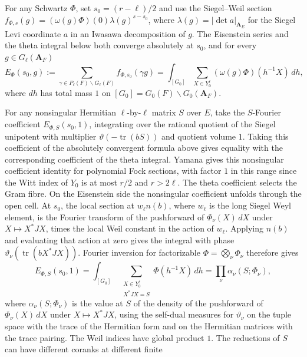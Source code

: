 For any Schwartz \(\Phi\), set \(s_0=(r-\ell)/2\) and use the
Siegel--Weil section \(f_{\Phi,s}(g)=(\omega(g)\Phi)(0)\lambda(g)^{s-s_0}\),
where \(\lambda(g)=|\det a|_{\mathbf A_E}\) for the Siegel Levi
coordinate \(a\) in an Iwasawa decomposition of \(g\).
The Eisenstein series and the theta integral below both converge
absolutely at \(s_0\), and for every \(g\in G_\ell(\mathbf A_F)\)
\[
 E_\Phi(s_0,g)
 :=\sum_{\gamma\in P_\ell(F)\backslash G_\ell(F)}
       f_{\Phi,s_0}(\gamma g)
 =\int_{[G_0]}\sum_{X\in Y_0^\ell}(\omega(g)\Phi)(h^{-1}X)\,dh,
\]
where \(dh\) has total mass \(1\) on
\([G_0]=G_0(F)\backslash G_0(\mathbf A_F)\).
\cite[Theorem~2.1(1) and the Weil-representation formulas, pp.~858--859]{tr3liu}

For any nonsingular Hermitian \(\ell\)-by-\(\ell\) matrix \(S\)
over \(E\), take the \(S\)-Fourier coefficient \(E_{\Phi,S}(s_0,1)\),
integrating over the rational
quotient of the Siegel unipotent with multiplier
\(\vartheta(-\operatorname{tr}(bS))\) and quotient volume \(1\).
Taking this coefficient of the absolutely convergent formula above
gives equality with the corresponding coefficient of the theta
integral. Yamana gives this nonsingular coefficient identity for
polynomial Fock sections, with factor \(1\) in this range since the
Witt index of \(Y_0\) is at most \(r/2\) and \(r>2\ell\).
\cite[Theorem~2 and Lemma~3.1, pp.~237, 246]{tr3yamana}
The theta coefficient selects the Gram fibre. On the Eisenstein
side the nonsingular coefficient unfolds through the open cell.
At \(s_0\), the local section at \(w_\ell n(b)\), where \(w_\ell\) is
the long Siegel Weyl element, is the Fourier transform of the
pushforward of \(\Phi_\nu(X)\,dX\) under \(X\mapsto X^*JX\), times
the local Weil constant in the action of \(w_\ell\). Applying
\(n(b)\) and evaluating that action at zero gives the integral with
phase \(\vartheta_\nu(\operatorname{tr}(bX^*JX))\).
Fourier inversion for factorizable \(\Phi=\bigotimes_\nu\Phi_\nu\)
therefore gives
\[
  E_{\Phi,S}(s_0,1)
  =\int_{[G_0]}\ \sum_{\substack{X\in Y_0^{\ell}\\ X^*JX=S}}
     \Phi(h^{-1}X)\,dh
     =\prod_\nu \alpha_\nu(S;\Phi_\nu),
\]
where \(\alpha_\nu(S;\Phi_\nu)\) is the value at \(S\) of the density
of the pushforward of \(\Phi_\nu(X)\,dX\) under \(X\mapsto X^*JX\),
using the self-dual measures for \(\vartheta_\nu\) on the tuple space
with the trace of the Hermitian form and on the Hermitian matrices
with the trace pairing.
The Weil indices have global product \(1\).
The reductions of \(S\) can have different coranks at different finite
